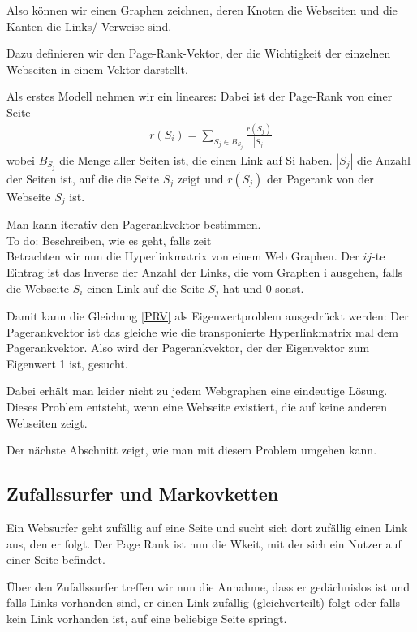 \documentclass[]{article}
\begin{document}
Also können wir einen Graphen zeichnen, deren Knoten die Webseiten und die Kanten die Links/ Verweise sind. 

 Dazu definieren wir den Page-Rank-Vektor, der die Wichtigkeit der einzelnen Webseiten in einem Vektor darstellt. 
 
 Als erstes Modell nehmen wir ein lineares: Dabei ist der Page-Rank von einer Seite 
 \begin{align}
 \label{PRV}
 	r(S_i)= \sum\limits_{S_j \in B_{S_j}} \frac{r(S_j)}{|S_j|}
 \end{align} 
wobei $B_{S_j}$ die Menge aller Seiten ist, die einen Link auf Si haben. $|S_j|$ die Anzahl der Seiten ist, auf die die Seite $S_j$ zeigt und $r(S_j)$ der Pagerank von der Webseite $S_j$ ist.

Man kann iterativ den Pagerankvektor bestimmen. \\

To do: Beschreiben, wie es geht, falls zeit \\

Betrachten wir nun die Hyperlinkmatrix von einem Web Graphen. Der $ij$-te Eintrag ist das Inverse der Anzahl der Links, die vom Graphen i ausgehen, falls die Webseite $S_i$ einen Link auf die Seite $S_j$ hat und 0 sonst. 

Damit kann die Gleichung \ref{PRV} als Eigenwertproblem ausgedrückt werden: Der Pagerankvektor ist das gleiche wie die transponierte Hyperlinkmatrix mal dem Pagerankvektor. Also wird der Pagerankvektor, der der Eigenvektor zum Eigenwert 1 ist, gesucht. 

Dabei erhält man leider nicht zu jedem Webgraphen eine eindeutige Lösung. Dieses Problem entsteht, wenn eine Webseite existiert, die auf keine anderen Webseiten zeigt. 

Der nächste Abschnitt zeigt, wie man mit diesem Problem umgehen kann. 

\subsection{Zufallssurfer und Markovketten}

Ein Websurfer geht zufällig auf eine Seite und sucht sich dort zufällig einen Link aus, den er folgt. Der Page Rank ist nun die Wkeit, mit der sich ein Nutzer auf einer Seite befindet. 

Über den Zufallssurfer treffen wir nun die Annahme, dass er gedächnislos ist und falls Links vorhanden sind, er einen Link zufällig (gleichverteilt) folgt oder falls kein Link vorhanden ist, auf eine beliebige Seite springt. 
\end{document}
